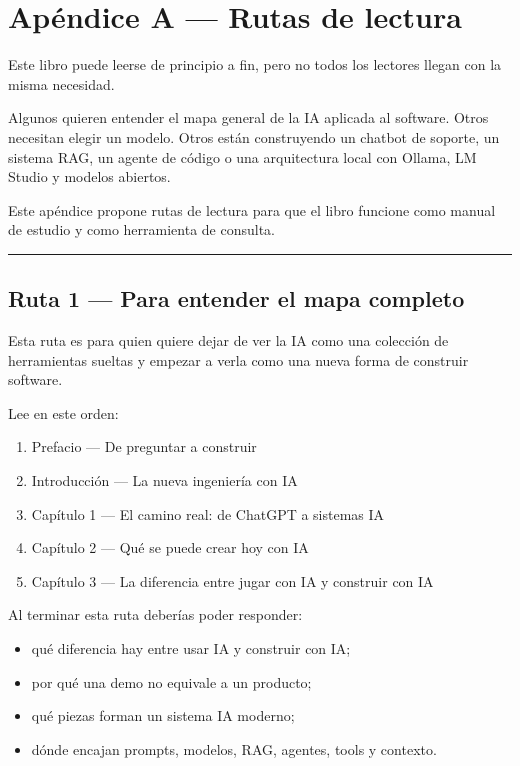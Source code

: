 \newpage

\chapter{Apéndice A --- Rutas de
lectura}\label{apuxe9ndice-a-rutas-de-lectura}

Este libro puede leerse de principio a fin, pero no todos los lectores
llegan con la misma necesidad.

Algunos quieren entender el mapa general de la IA aplicada al software.
Otros necesitan elegir un modelo. Otros están construyendo un chatbot de
soporte, un sistema RAG, un agente de código o una arquitectura local
con Ollama, LM Studio y modelos abiertos.

Este apéndice propone rutas de lectura para que el libro funcione como
manual de estudio y como herramienta de consulta.

\begin{center}\rule{0.5\linewidth}{0.5pt}\end{center}

\section{Ruta 1 --- Para entender el mapa
completo}\label{ruta-1-para-entender-el-mapa-completo}

Esta ruta es para quien quiere dejar de ver la IA como una colección de
herramientas sueltas y empezar a verla como una nueva forma de construir
software.

Lee en este orden:

\begin{enumerate}
\def\labelenumi{\arabic{enumi}.}
\tightlist
\item
  Prefacio --- De preguntar a construir
\item
  Introducción --- La nueva ingeniería con IA
\item
  Capítulo 1 --- El camino real: de ChatGPT a sistemas IA
\item
  Capítulo 2 --- Qué se puede crear hoy con IA
\item
  Capítulo 3 --- La diferencia entre jugar con IA y construir con IA
\end{enumerate}

Al terminar esta ruta deberías poder responder:

\begin{itemize}
\tightlist
\item
  qué diferencia hay entre usar IA y construir con IA;
\item
  por qué una demo no equivale a un producto;
\item
  qué piezas forman un sistema IA moderno;
\item
  dónde encajan prompts, modelos, RAG, agentes, tools y contexto.
\end{itemize}

